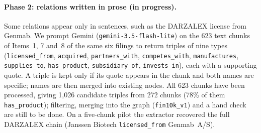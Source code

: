 \documentclass[10pt,twocolumn,letterpaper]{article}
\begin{document}
\begin{table}[t]
  \centering
  \caption{The rule-based graph \texttt{fin10k\_v0}. Chunks are listed per filing in fiscal-year
  order. Entity nodes: 3 companies, 450 subsidiaries, 101 locations, 11 segments, 10 business lines,
  60 products, 21 metrics, 13 fiscal years. Structural edges: \texttt{has\_subsidiary},
  \texttt{incorporated\_in}, \texttt{part\_of}, \texttt{has\_segment}, \texttt{has\_business\_line},
  \texttt{has\_product}; Value edges: \texttt{has\_value}, \texttt{of\_metric}, \texttt{for\_period},
  \texttt{in\_location}; Mention edges: \texttt{is\_mentioned\_in}. The full eight-company corpus has
  7,339 chunks.}
  \label{tab:graph}
\end{table}

\paragraph{Phase 2: relations written in prose (in progress).}
Some relations appear only in sentences, such as the DARZALEX license from Genmab. We prompt Gemini
(\texttt{gemini-3.5-flash-lite}) on the 623 text chunks of Items~1, 7 and~8 of the same six filings to
return triples of nine types (\texttt{licensed\_from}, \texttt{acquired}, \texttt{partners\_with},
\texttt{competes\_with}, \texttt{manufactures}, \texttt{supplies\_to}, \texttt{has\_product},
\texttt{subsidiary\_of}, \texttt{invests\_in}), each with a supporting quote. A triple is kept only
if its quote appears in the chunk and both names are specific; names are then merged into existing
nodes. All 623 chunks have been processed, giving 1,026 candidate triples from 272 chunks (78\% of
them \texttt{has\_product}); filtering, merging into the graph (\texttt{fin10k\_v1}) and a hand
check are still to be done. On a five-chunk pilot the extractor recovered the full DARZALEX chain
(Janssen Biotech \texttt{licensed\_from} Genmab~A/S).
\end{document}
